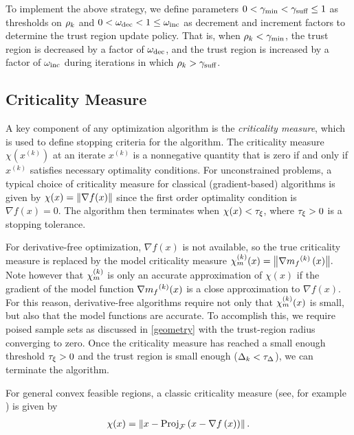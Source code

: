 \documentclass{article}
\begin{document}
To implement the above strategy,  we define parameters
$
0 < \gamma_{\textrm{min}} < \gamma_{\textrm{suff}} \le 1
$
as thresholds on $\rho_k$ and
$
0 < \omega_{\text{dec}} < 1 \le \omega_{\text{inc}}
$
as decrement and increment factors to determine the trust region update policy.
That is, when $\rho_k < \gamma_{\textrm{min}}$, the trust region is decreased by a factor of $\omega_{\text{dec}}$, and the trust region is increased by a factor of $\omega_{\text{inc}}$
during iterations in which $\rho_k > \gamma_{\textrm{suff}}$.



\subsection{Criticality Measure}

\label{criticality_measure_section}

A key component of any optimization algorithm is the {\em criticality measure}, which is used to define stopping criteria for the algorithm.
The criticality measure $\chi(x^{(k)})$ at an iterate $x^{(k)}$ is a nonnegative quantity that is zero if and only if $x^{(k)}$ satisfies necessary optimality conditions.
For unconstrained problems,  a typical choice of criticality measure for classical (gradient-based) algorithms is given by $\chi(x) = {\left\|\nabla f(x)\right\|}$
since the first order optimality condition is $\nabla f(x)=0$.
The algorithm then terminates when $\chi(x) < \tau_{\xi}$, where $\tau_{\xi} >0$ is a stopping tolerance.

For derivative-free optimization,  $\nabla f(x)$ is not available,  so the true criticality measure is replaced by the model criticality measure
${\chi_m^{(k)}}(x) = {\left\|\nabla {{m}_f}^{(k)}\left(x\right)\right\|}.$
Note however that ${\chi_m^{(k)}}$ is only an accurate approximation of $\chi(x)$ if the gradient of the model function $\nabla {{m}_f}^{(k)}(x)$ is a close approximation to $\nabla f(x)$.
For this reason, derivative-free algorithms require not only that ${\chi_m^{(k)}}(x)$ is small, but also that the model functions are accurate.
To accomplish this, we require poised sample sets as discussed in \cref{geometry} with the trust-region radius converging to zero.
Once the criticality measure has reached a small enough threshold $\tau_{\xi} > 0$ and the trust region is small enough ($\Delta_k < \tau_{\Delta}$),
we can terminate the algorithm.




For general convex feasible regions,
a classic criticality measure (see, for example \cite{Conejo:2013:GCT:2620806.2621814} \cite{Conn:2000:TM:357813}) is given by
\begin{align}
\label{define_criticality_measure}
\chi(x) = \left\|x - {\textrm{Proj}}_{{\mathcal F}}\left(x- \nabla f\left(x\right)\right)\right\|.
\end{align}
\end{document}
